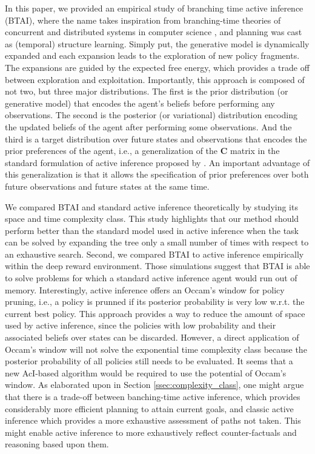\documentclass[twoside,11pt]{article}
\begin{document}
In this paper, we provided an empirical study of branching time active inference (BTAI), where the name takes inspiration from branching-time theories of concurrent and distributed systems in computer science \citep{concurrency_glabbeek,concurrency_glabbeek_2,concurrency_howard}, and planning was cast as (temporal) structure learning. Simply put, the generative model is dynamically expanded and each expansion leads to the exploration of new policy fragments. The expansions are guided by the expected free energy, which provides a trade off between exploration and exploitation. Importantly, this approach is composed of not two, but three major distributions. The first is the prior distribution (or generative model) that encodes the agent's beliefs before performing any observations. The second is the posterior (or variational) distribution encoding the updated beliefs of the agent after performing some observations. And the third is a target distribution over future states and observations that encodes the prior preferences of the agent, i.e., a generalization of the $\bm{C}$ matrix in the standard formulation of active inference proposed by \citet{FRISTON2016862}. An important advantage of this generalization is that it allows the specification of prior preferences over both future observations and future states at the same time.

We compared BTAI and standard active inference theoretically by studying its space and time complexity class. This study highlights that our method should perform better than the standard model used in active inference when the task can be solved by expanding the tree only a small number of times with respect to an exhaustive search. Second, we compared BTAI to active inference empirically within the deep reward environment. Those simulations suggest that BTAI is able to solve problems for which a standard active inference agent would run out of memory. Interestingly, active inference offers an Occam's window \citep{AI_TUTO} for policy pruning, i.e., a policy is prunned if its posterior probability is very low w.r.t. the current best policy. This approach provides a way to reduce the amount of space used by active inference, since the policies with low probability and their associated beliefs over states can be discarded. However, a direct application of Occam's window will not solve the exponential time complexity class because the posterior probability of all policies still needs to be evaluated. It seems that a new AcI-based algorithm would be required to use the potential of Occam's window. As elaborated upon in Section \ref{ssec:complexity_class}, one might argue that there is a trade-off between banching-time active inference, which provides considerably more efficient planning to attain current goals, and classic active inference which provides a more exhaustive assessment of paths not taken. This might enable active inference to more exhaustively reflect counter-factuals and reasoning based upon them.
\end{document}
